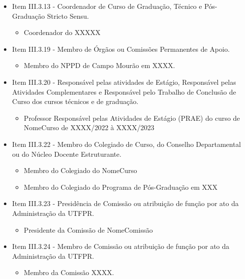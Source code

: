 \begin{itemize}
    \item Item III.3.13 - Coordenador de Curso de Graduação, Técnico e Pós-Graduação Stricto Sensu.
    \begin{itemize}
        \item Coordenador do XXXXX
    \end{itemize}

    \item Item III.3.19 - Membro de Órgãos ou Comissões Permanentes de Apoio.
    \begin{itemize}
        \item Membro do NPPD de Campo Mourão em XXXX.
    \end{itemize}

    \item Item III.3.20 - Responsável pelas atividades de Estágio, Responsável pelas Atividades Complementares e Responsável pelo Trabalho de Conclusão de Curso dos cursos técnicos e de graduação.
    \begin{itemize}
        \item Professor Responsável pelas Atividades de Estágio (PRAE) do curso de NomeCurso de XXXX/2022 à  XXXX/2023
    \end{itemize}

    \item Item III.3.22 - Membro do Colegiado de Curso, do Conselho Departamental ou do Núcleo Docente Estruturante.
    \begin{itemize}
        \item Membro do Colegiado do NomeCurso

        \item Membro do Colegiado do Programa de Pós-Graduação em XXX
    \end{itemize}

    \item Item III.3.23 - Presidência de Comissão ou atribuição de função por ato da Administração da UTFPR.
    \begin{itemize}
        \item Presidente da Comissão de NomeComissão
    \end{itemize}


    \item Item III.3.24 - Membro de Comissão ou atribuição de função por ato da Administração da UTFPR.
    \begin{itemize}
        \item Membro da Comissão XXXX.
    \end{itemize}
\end{itemize}


